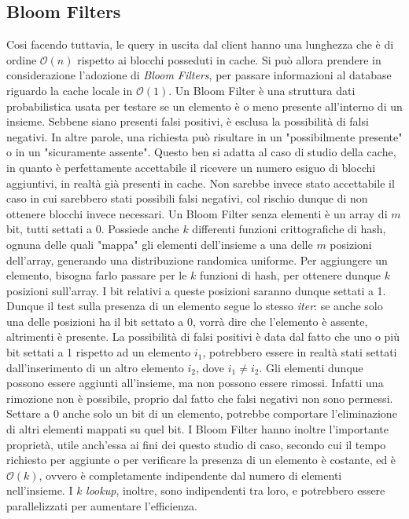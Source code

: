 	\subsection{Bloom Filters}
	

		Cosi facendo tuttavia, le query in uscita dal client hanno una lunghezza che è di ordine $\mathcal{O}(n)$ rispetto ai blocchi posseduti in cache. Si può allora prendere in considerazione l'adozione di \textit{Bloom Filters}, per passare informazioni al database riguardo la cache locale in $\mathcal{O}(1)$.
		Un Bloom Filter è una struttura dati probabilistica usata per testare se un elemento è o meno presente all'interno di un insieme. Sebbene siano presenti falsi positivi, è esclusa la possibilità di falsi negativi. In altre parole, una richiesta può risultare in un "possibilmente presente" o in un "sicuramente assente". Questo ben si adatta al caso di studio della cache, in quanto è perfettamente accettabile il ricevere un numero esiguo di blocchi aggiuntivi, in realtà già presenti in cache. Non sarebbe invece stato accettabile il caso in cui sarebbero stati possibili falsi negativi, col rischio dunque di non ottenere blocchi invece necessari.
		Un Bloom Filter senza elementi è un array di $ m $ bit, tutti settati a 0. Possiede anche $ k $ differenti funzioni crittografiche di hash, ognuna delle quali "mappa" gli elementi dell'insieme a una delle $ m $ posizioni dell'array, generando una distribuzione randomica uniforme. Per aggiungere un elemento, bisogna farlo passare per le $ k $ funzioni di hash, per ottenere dunque $ k $ posizioni sull'array. I bit relativi a queste posizioni saranno dunque settati a 1. Dunque il test sulla presenza di un elemento segue lo stesso \textit{iter}: se anche solo una delle posizioni ha il bit settato a 0, vorrà dire che l'elemento è assente, altrimenti è presente. La possibilità di falsi positivi è data dal fatto che uno o più bit settati a 1 rispetto ad un elemento $ i_{1} $, potrebbero essere in realtà stati settati dall'inserimento di un altro elemento $ i_{2} $, dove $ i_{1}\ne i_{2} $.	
		Gli elementi dunque possono essere aggiunti all'insieme, ma non possono essere rimossi. Infatti una rimozione non è possibile, proprio dal fatto che falsi negativi non sono permessi. Settare a 0 anche solo un bit di un elemento, potrebbe comportare l'eliminazione di altri elementi mappati su quel bit.
		I Bloom Filter hanno inoltre l'importante proprietà, utile anch'essa ai fini dei questo studio di caso, secondo cui il tempo richiesto per aggiunte o per verificare la presenza di un elemento è costante, ed è $\mathcal{O}(k)$, ovvero è completamente indipendente dal numero di elementi nell'insieme. I $ k $ \textit{lookup}, inoltre, sono indipendenti tra loro, e potrebbero essere parallelizzati per aumentare l'efficienza.
		
